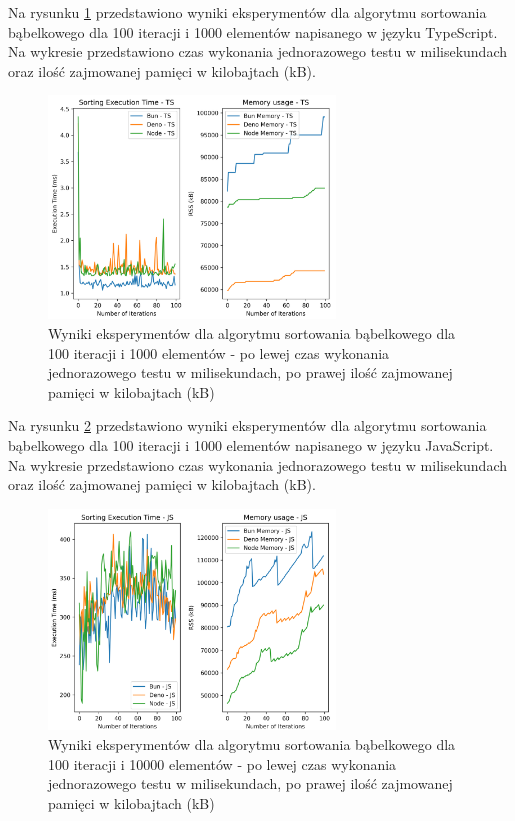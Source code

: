 Na rysunku \ref{fig:bubble_sorting_e1_ts} przedstawiono wyniki eksperymentów dla algorytmu sortowania bąbelkowego dla 100 iteracji i 1000 elementów napisanego w języku TypeScript. Na wykresie przedstawiono czas wykonania jednorazowego testu w milisekundach oraz ilość zajmowanej pamięci w kilobajtach (kB).

\begin{figure}[H]
  \centering
  \includegraphics[width=0.68\textwidth]{Figures/sorting/sorting_bubble_100_1000_ts.png}
  \caption{Wyniki eksperymentów dla algorytmu sortowania bąbelkowego dla 100 iteracji i 1000 elementów - po lewej czas wykonania jednorazowego testu w milisekundach, po prawej ilość zajmowanej pamięci w kilobajtach (kB)}
  \label{fig:bubble_sorting_e1_ts}
\end{figure}

Na rysunku \ref{fig:bubble_sorting_e2} przedstawiono wyniki eksperymentów dla algorytmu sortowania bąbelkowego dla 100 iteracji i 1000 elementów napisanego w języku JavaScript. Na wykresie przedstawiono czas wykonania jednorazowego testu w milisekundach oraz ilość zajmowanej pamięci w kilobajtach (kB).

\begin{figure}[H]
  \centering
  \includegraphics[width=0.68\textwidth]{Figures/sorting/sorting_bubble_100_10000_js.png}
  \caption{Wyniki eksperymentów dla algorytmu sortowania bąbelkowego dla 100 iteracji i 10000 elementów - po lewej czas wykonania jednorazowego testu w milisekundach, po prawej ilość zajmowanej pamięci w kilobajtach (kB)}
  \label{fig:bubble_sorting_e2}
\end{figure}

